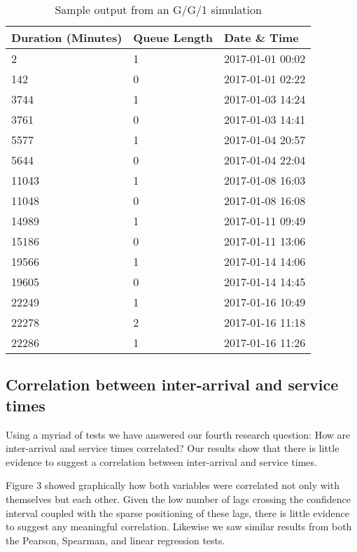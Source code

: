 \documentclass[5p]{elsarticle}
\begin{document}
\begin {table}
\caption {Sample output from an G/G/1 simulation} 
\begin{center}
\begin{tabular}{p{1.8cm} |  p{1.25cm} | p{3.2cm}} \hline \bf{Duration (Minutes)} & \bf{Queue Length}  & \bf{Date \& Time}
\\ \hline 2  & 1 & 2017-01-01 00:02
\\ 142 & 0 & 2017-01-01 02:22
\\ 3744 & 1 & 2017-01-03 14:24 
\\ 3761 & 0 & 2017-01-03 14:41
\\ 5577 & 1 & 2017-01-04 20:57
\\ 5644 & 0 & 2017-01-04 22:04
\\ 11043 & 1 & 2017-01-08 16:03
\\ 11048 & 0 & 2017-01-08 16:08
\\ 14989 & 1 & 2017-01-11 09:49 
\\ 15186 & 0 & 2017-01-11 13:06 
\\ 19566 & 1 & 2017-01-14 14:06
\\ 19605 & 0 & 2017-01-14 14:45
\\ 22249 & 1 &  2017-01-16 10:49
\\ 22278 & 2 & 2017-01-16 11:18
\\ 22286 & 1 & 2017-01-16 11:26
\\ \hline
\end{tabular}
\end{center}
\end{table}


\subsection{Correlation between inter-arrival and service times}

Using a myriad of tests we have answered our fourth research question: How are inter-arrival and service times correlated? Our results show that there is little evidence to suggest a correlation between inter-arrival and service times.

Figure 3 showed graphically how both variables were correlated not only with themselves but each other. Given the low number of lags crossing the confidence interval coupled with the sparse positioning of these lags, there is little evidence to suggest any meaningful correlation. Likewise we saw similar results from both the Pearson, Spearman, and linear regression tests. 
\end{document}

